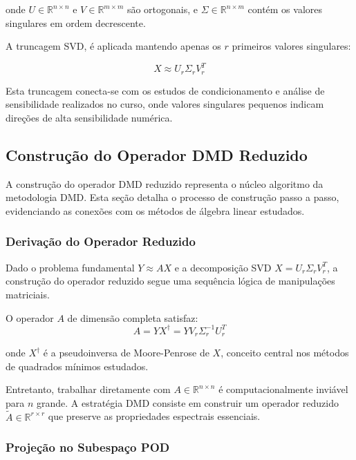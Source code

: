 \documentclass[a4,11pt]{pssbmac}
\begin{document}
onde $U \in \mathbb{R}^{n \times n}$ e $V \in \mathbb{R}^{m \times m}$ são ortogonais, e $\Sigma \in \mathbb{R}^{n \times m}$ contém os valores singulares em ordem decrescente.

A truncagem SVD, é aplicada mantendo apenas os $r$ primeiros valores singulares:

\begin{equation}
X \approx U_r\Sigma_r V_r^T \label{eq:truncated_svd}
\end{equation}

Esta truncagem conecta-se com os estudos de condicionamento e análise de sensibilidade realizados no curso, onde valores singulares pequenos indicam direções de alta sensibilidade numérica.

\subsection{Construção do Operador DMD Reduzido}

A construção do operador DMD reduzido representa o núcleo algoritmo da metodologia DMD. Esta seção detalha o processo de construção passo a passo, evidenciando as conexões com os métodos de álgebra linear estudados.

\subsubsection{Derivação do Operador Reduzido}

Dado o problema fundamental $Y \approx AX$ e a decomposição SVD $X = U_r\Sigma_r V_r^T$, a construção do operador reduzido segue uma sequência lógica de manipulações matriciais.

O operador $A$ de dimensão completa satisfaz:
\begin{equation}
A = YX^{\dagger} = YV_r\Sigma_r^{-1}U_r^T \label{eq:full_operator}
\end{equation}

onde $X^{\dagger}$ é a pseudoinversa de Moore-Penrose de $X$, conceito central nos métodos de quadrados mínimos estudados.

Entretanto, trabalhar diretamente com $A \in \mathbb{R}^{n \times n}$ é computacionalmente inviável para $n$ grande. A estratégia DMD consiste em construir um operador reduzido $\tilde{A} \in \mathbb{R}^{r \times r}$ que preserve as propriedades espectrais essenciais.

\subsubsection{Projeção no Subespaço POD}
\end{document}
